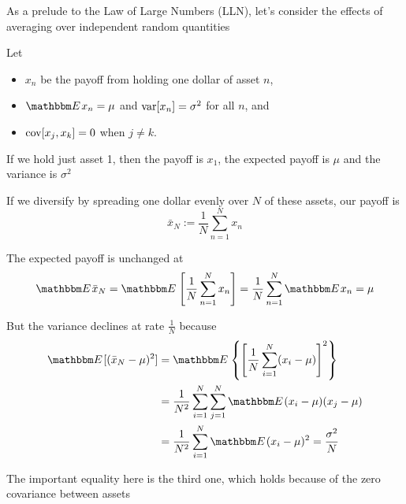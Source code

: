 \begin{frame}
    
    \vspace{2em}
    As a prelude to the Law of Large Numbers (LLN), let's consider the
    effects of averaging over independent random quantities
    
    Let 
    \begin{itemize}
        \item $x_n$ be the payoff from holding one dollar of asset $n$,
        \item $\EE x_n = \mu$ and $\operatorname{var}[x_n] = \sigma^2$ for all $n$, and
        \item $\operatorname{cov}[x_j, x_k] = 0$ when $j \not= k$.
    \end{itemize}
    
    \vspace{1em}
    If we hold just asset 1, then the payoff is $x_1$, the expected payoff is $\mu$
    and the variance is $\sigma^2$
    
\end{frame}


\begin{frame}

    \vspace{2em}
    If we diversify by
    spreading one dollar evenly over $N$ of these assets, our payoff is
    \begin{equation*}
        \bar x_N := \frac{1}{N} \sum_{n=1}^N x_n
    \end{equation*}
    
    \vspace{1em}
    The expected payoff is unchanged at 
    \begin{equation*}
        \label{eq:meanub}
        \EE  \bar x_N 
            = \EE \left[ \frac{1}{N} \sum_{n=1}^N x_n \right]
            = \frac{1}{N} \sum_{n=1}^N \EE  x_n 
            = \mu
    \end{equation*}
    
\end{frame}


\begin{frame}

    \vspace{2em}
    But the variance declines at rate $\frac{1}{N}$ because
    \begin{align*}
        \EE [(\bar x_N - \mu)^2 ]  
        & = \EE \left\{ \left[ \frac{1}{N} \sum_{i=1}^N (x_i - \mu) \right]^2 \right\}
        \\
        & = \frac{1}{N^2} \sum_{i=1}^N \sum_{j=1}^N \EE (x_i - \mu)(x_j - \mu) 
        \\& = \frac{1}{N^2} \sum_{i=1}^N \EE (x_i - \mu)^2 
        = \frac{\sigma^2}{N} 
    \end{align*}
    
    The important equality here is the third one, which holds because of the zero
    covariance between assets
    
\end{frame}

